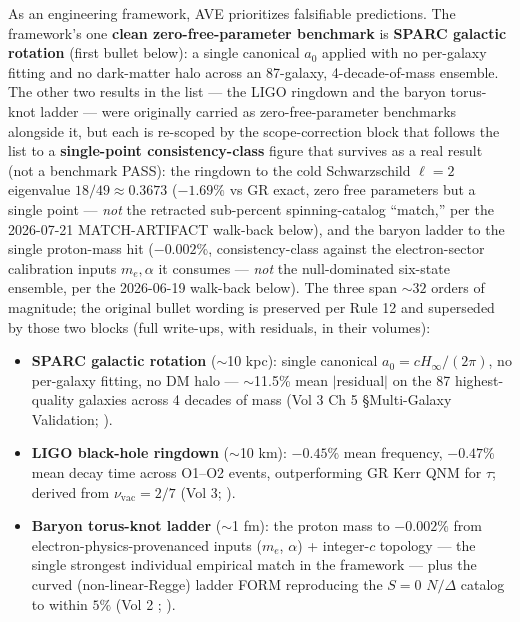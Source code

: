 \noindent As an engineering framework, AVE prioritizes falsifiable predictions. The framework's one \textbf{clean zero-free-parameter benchmark} is \textbf{SPARC galactic rotation} (first bullet below): a single canonical $a_0$ applied with no per-galaxy fitting and no dark-matter halo across an 87-galaxy, 4-decade-of-mass ensemble. The other two results in the list --- the LIGO ringdown and the baryon torus-knot ladder --- were originally carried as zero-free-parameter benchmarks alongside it, but each is re-scoped by the scope-correction block that follows the list to a \textbf{single-point consistency-class} figure that survives as a real result (not a benchmark PASS): the ringdown to the cold Schwarzschild $\ell = 2$ eigenvalue $18/49 \approx 0.3673$ ($\mathbf{-1.69\%}$ vs GR exact, zero free parameters but a single point --- \emph{not} the retracted sub-percent spinning-catalog ``match,'' per the 2026-07-21 MATCH-ARTIFACT walk-back below), and the baryon ladder to the single proton-mass hit ($-0.002\%$, consistency-class against the electron-sector calibration inputs $m_e, \alpha$ it consumes --- \emph{not} the null-dominated six-state ensemble, per the 2026-06-19 walk-back below). The three span $\sim 32$ orders of magnitude; the original bullet wording is preserved per Rule 12 and superseded by those two blocks (full write-ups, with residuals, in their volumes):
\begin{itemize}\itemsep 0pt
    \item \textbf{SPARC galactic rotation} ($\sim$10 kpc): single canonical $a_0 = cH_\infty/(2\pi)$, no per-galaxy fitting, no DM halo --- $\sim$11.5\% mean $|$residual$|$ on the 87 highest-quality galaxies across 4 decades of mass (Vol 3 Ch 5 \S Multi-Galaxy Validation; ).
    \item \textbf{LIGO black-hole ringdown} ($\sim$10 km): $-0.45\%$ mean frequency, $-0.47\%$ mean decay time across O1--O2 events, outperforming GR Kerr QNM for $\tau$; derived from $\nu_{\text{vac}} = 2/7$ (Vol 3; ).
    \item \textbf{Baryon torus-knot ladder} ($\sim$1 fm): the proton mass to $-0.002\%$ from electron-physics-provenanced inputs ($m_e$, $\alpha$) + integer-$c$ topology --- the single strongest individual empirical match in the framework --- plus the curved (non-linear-Regge) ladder FORM reproducing the $S=0$ $N/\Delta$ catalog to within $5\%$ (Vol 2 ; ).
\end{itemize}

